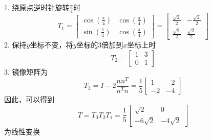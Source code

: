 \documentclass[onecolumn,oneside]{SUSTechHomework}
\begin{document}
  \subsection{}
  \subsubsection{}
  1. 绕原点逆时针旋转\(\frac{\pi}{4}\)时
  \[
    T_1 = \begin{bmatrix}
      \cos(\frac{\pi}{4}) & \cos(\frac{\pi}{4}) \\
      \sin(\frac{\pi}{4}) & \cos(\frac{\pi}{4})
    \end{bmatrix}
    = \begin{bmatrix}
      \frac{\sqrt{2}}{2} & -\frac{\sqrt{2}}{2} \\
      \frac{\sqrt{2}}{2} & \frac{\sqrt{2}}{2}
    \end{bmatrix}
  \]
  2. 保持\(y\)坐标不变，将\(y\)坐标的3倍加到\(x\)坐标上时
  \[
    T_2 = \begin{bmatrix}
      1 & 3 \\ 0 & 1
    \end{bmatrix}
  \]
  3. 镜像矩阵为
  \[
    T_3 = I - 2\frac{nn^T}{n^Tn} = \frac{1}{5}\begin{bmatrix}
      1 & -2 \\ -2 & -4
    \end{bmatrix}
  \]
  因此，可以得到
  \[
    T = T_3T_2T_1 = \frac{1}{5}\begin{bmatrix}
      \sqrt{2} & 0 \\ -6\sqrt{2} & -4\sqrt{2}
    \end{bmatrix}
  \]
  为线性变换
\end{document}
